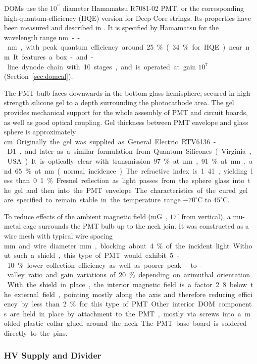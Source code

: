 DOMs use the $10^{\prime\prime}$ diameter Hamamatsu R7081-02 PMT, 
or the corresponding high-quantum-efficiency (HQE) version for Deep Core strings.
Its properties have been measured and described in \cite{ref:pmt}.  It is specified by Hamamatsu for
the wavelength range \unit[300]nm--\unit[650]nm, with peak quantum efficiency around 25\% (34\% for HQE)
near \unit[390]nm.  It features a box-and-line dynode chain with 10 stages, and is operated at gain $10^7$
(Section~\ref{sec:domcal}).

The PMT bulb faces downwards in the bottom glass hemisphere, secured in high-strength 
silicone gel to a depth surrounding the photocathode area.  
The gel provides mechanical support for the whole assembly of PMT and circuit boards,
as well as good optical coupling.  
Gel thickness between PMT envelope and glass sphere is approximately \unit[1]cm.  
Originally the gel was supplied as General Electric RTV6136-D1,
and later as a similar formulation from Quantum Silicones (Virginia, USA).  
It is optically clear with transmission 97\% at \unit[400]nm, 91\% at \unit[340]nm, and 65\% at \unit[300]nm
(normal incidence).  The refractive index is 1.41, yielding less than 0.1\% Fresnel reflection as light
passes from the sphere glass into the gel and then into the PMT envelope.
The characteristics of the cured gel are specified to remain stable in the temperature range $-70^\circ$C to $45^\circ$C.

To reduce effects of the ambient magnetic field (\unit[550]mG, $17^\circ$ from vertical), a mu-metal cage surrounds the PMT bulb up to
the neck join.  It was constructed as a wire mesh with typical wire spacing \unit[66]mm and
wire diameter \unit[1]mm, blocking about 4\% of the incident light.
Without such a shield, this type of PMT would exhibit 5-10\% lower collection efficiency as well
as poorer peak-to-valley ratio and gain variations of 20\% depending on 
azimuthal orientation~\cite{calvo}.
With the shield in place, the interior magnetic field is a factor 2.8 below
the external field, pointing mostly along the axis and therefore reducing efficiency by
less than 2\% for this type of PMT.

Other interior DOM components are held in place by attachment to the PMT, mostly via screws into
a molded plastic collar glued around the neck.  The PMT base board is soldered directly to the pins.

\subsubsection{\label{sec:hv}HV Supply and Divider}

